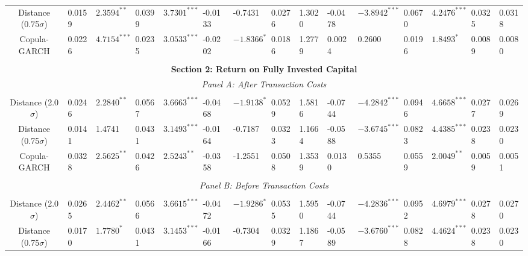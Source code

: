 \documentclass[a4paper]{article}
\begin{document}
\begin{sidewaystable}
\begin{threeparttable}[H]
\begin{tabularx}{\textwidth}{@{\extracolsep{\fill}}lllllllllllllll@{}}
				\multicolumn{1}{c}{Distance (0.75$\sigma$)} & 0.0159 & $2.3594^{**}$ & 0.0399 & $3.7301^{***}$ & -0.0133 & -0.7431 & 0.0276 & 1.3020 & -0.0478 & $-3.8942^{***}$ & 0.0670 & $4.2476^{***}$ & 0.0325 & 0.0318 \\
				\multicolumn{1}{c}{Copula-GARCH} & 0.0226 & $4.7154^{***}$ & 0.0235 & $3.0533^{***}$ & -0.0202 & $-1.8366^{*}$ & 0.0186 & 1.2779 & 0.0024 & 0.2600 & 0.0196 & $1.8493^{*}$ & 0.0089 & 0.0080  \\
				&       &       &       &       &       &       &       &       &       &       &       &       &       &  \\
				\midrule
				\multicolumn{15}{c}{\textbf{Section 2: Return on Fully Invested Capital}} \\
				\multicolumn{15}{c}{\textit{Panel A: After Transaction Costs}} \\
				&       &       &       &       &       &       &       &       &       &       &       &       &       &  \\
				\multicolumn{1}{c}{Distance (2.0$\sigma$)} & 0.0246 & $2.2840^{**}$ & 0.0567 & $3.6663^{***}$ & -0.0468 & $-1.9138^{*}$ & 0.0529 & 1.5816 & -0.0744 & $-4.2842^{***}$ & 0.0946 & $4.6658^{***}$ & 0.0277 & 0.0269\\
				\multicolumn{1}{c}{Distance (0.75$\sigma$)} & 0.0141 & 1.4741 & 0.0431 & $3.1493^{***}$ & -0.0164 & -0.7187 & 0.0323 & 1.1664 & -0.0588 & $-3.6745^{***}$ & 0.0823 & $4.4385^{***}$ & 0.0238 & 0.0230 \\
				\multicolumn{1}{c}{Copula-GARCH} & 0.0328 & $2.5625^{**}$ & 0.0426 & $2.5243^{**}$ & -0.0358 & -1.2551 & 0.0508 & 1.3539 & 0.0130 & 0.5355 & 0.0559 & $2.0049^{**}$ & 0.0059 & 0.0051  \\
				&       &       &       &       &       &       &       &       &       &       &       &       &       &  \\
				\multicolumn{15}{c}{\textit{Panel B: Before Transaction Costs}} \\
				&       &       &       &       &       &       &       &       &       &       &       &       &       &  \\
				\multicolumn{1}{c}{Distance (2.0$\sigma$)} & 0.0265 & $2.4462^{**}$ & 0.0566 & $3.6615^{***}$ & -0.0472 & $-1.9286^{*}$ & 0.0535 & 1.5950 & -0.0744 & $-4.2836^{***}$ & 0.0952 & $4.6979^{***}$ & 0.0278 & 0.0270 \\
				\multicolumn{1}{c}{Distance (0.75$\sigma$)} & 0.0170 & $1.7780^{*}$ & 0.0431 & $3.1453^{***}$ & -0.0166 & -0.7304 & 0.0329 & 1.1867 & -0.0589 & $-3.6760^{***}$ & 0.0828 & $4.4624^{***}$ & 0.0238 & 0.0230 \\

\end{tabularx}
\end{threeparttable}
\end{sidewaystable}
\end{document}
